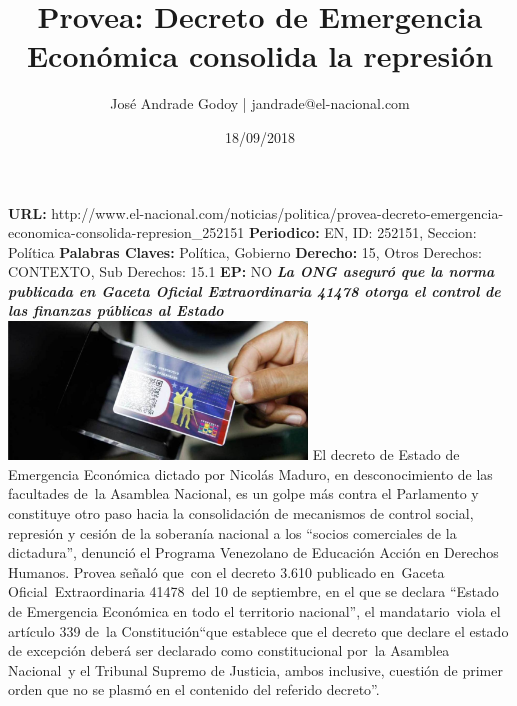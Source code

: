 \documentclass{article}%
\title{\textbf{Provea: Decreto de Emergencia Económica consolida la represión}}%
\author{José Andrade Godoy | jandrade@el{-}nacional.com}%
\date{18/09/2018}%
\begin{document}
%
\normalsize%
\maketitle%
\textbf{URL: }%
http://www.el{-}nacional.com/noticias/politica/provea{-}decreto{-}emergencia{-}economica{-}consolida{-}represion\_252151\newline%
%
\textbf{Periodico: }%
EN, %
ID: %
252151, %
Seccion: %
Política\newline%
%
\textbf{Palabras Claves: }%
Política, Gobierno\newline%
%
\textbf{Derecho: }%
15, %
Otros Derechos: %
CONTEXTO, %
Sub Derechos: %
15.1\newline%
%
\textbf{EP: }%
NO\newline%
\newline%
%
\textbf{\textit{La ONG aseguró que la norma publicada en Gaceta Oficial Extraordinaria 41478 otorga el control de las finanzas públicas al Estado}}%
\newline%
\newline%
%
\includegraphics[width=300px]{249.jpg}%
\newline%
%
El decreto de Estado de Emergencia Económica dictado por Nicolás Maduro, en desconocimiento de las facultades de~la Asamblea Nacional, es un golpe más contra el Parlamento y constituye otro paso hacia la consolidación de mecanismos de control social, represión y cesión de la soberanía nacional a los “socios comerciales de la dictadura”, denunció el Programa Venezolano de Educación Acción en Derechos Humanos.%
\newline%
%
Provea señaló que~con el decreto 3.610 publicado en~Gaceta Oficial~Extraordinaria 41478~del 10 de septiembre, en el que se declara “Estado de Emergencia Económica en todo el territorio nacional”, el mandatario~viola el artículo 339 de~la Constitución“que establece que el decreto que declare el estado de excepción deberá ser declarado como constitucional por~la Asamblea Nacional~y el Tribunal Supremo de Justicia, ambos inclusive, cuestión de primer orden que no se plasmó en el contenido del referido decreto”.%
\newline%
\end{document}
